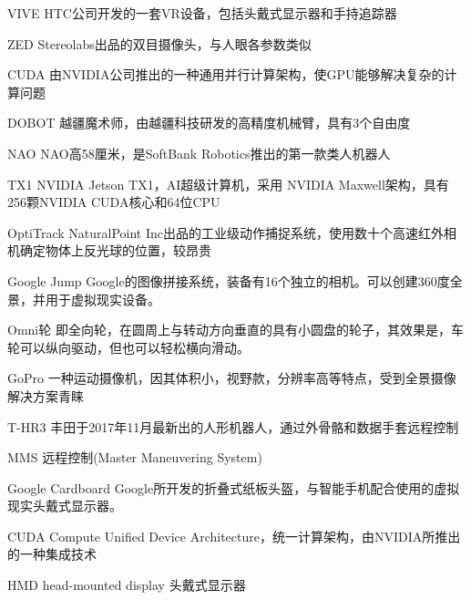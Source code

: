 \begin{denotation}[3cm]
\item[VIVE] HTC公司开发的一套VR设备，包括头戴式显示器和手持追踪器
\item[ZED] Stereolabs出品的双目摄像头，与人眼各参数类似
\item[CUDA] 由NVIDIA公司推出的一种通用并行计算架构，使GPU能够解决复杂的计算问题
\item[DOBOT] 越疆魔术师，由越疆科技研发的高精度机械臂，具有3个自由度
\item[NAO] NAO高58厘米，是SoftBank Robotics推出的第一款类人机器人
\item[TX1]  NVIDIA Jetson TX1，AI超级计算机，采用 NVIDIA Maxwell架构，具有256颗NVIDIA CUDA核心和64位CPU
\item[OptiTrack]  NaturalPoint Inc出品的工业级动作捕捉系统，使用数十个高速红外相机确定物体上反光球的位置，较昂贵
\item[Google Jump] Google的图像拼接系统，装备有16个独立的相机。可以创建360度全景，并用于虚拟现实设备。
\item[Omni轮] 即全向轮，在圆周上与转动方向垂直的具有小圆盘的轮子，其效果是，车轮可以纵向驱动，但也可以轻松横向滑动。
\item[GoPro] 一种运动摄像机，因其体积小，视野款，分辨率高等特点，受到全景摄像解决方案青睐
\item[T-HR3]丰田于2017年11月最新出的人形机器人，通过外骨骼和数据手套远程控制
\item[MMS]远程控制(Master Maneuvering System)
\item[Google Cardboard] Google所开发的折叠式纸板头盔，与智能手机配合使用的虚拟现实头戴式显示器。
\item[CUDA] Compute Unified Device Architecture，统一计算架构，由NVIDIA所推出的一种集成技术
\item[HMD] head-mounted display 头戴式显示器
\item[]
\item[]



\end{denotation}
